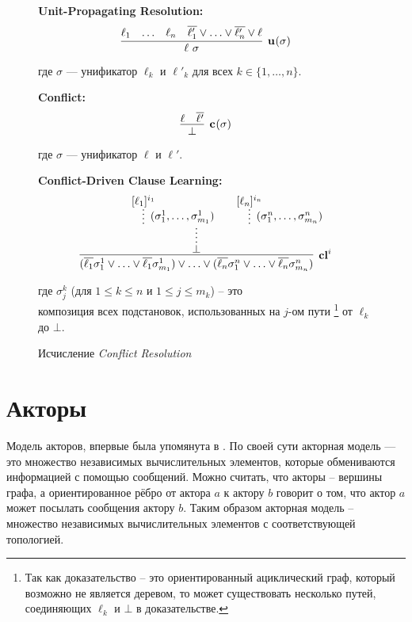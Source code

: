 \begin{figure}
\begin{calculus}
\centering
\textbf{Unit-Propagating Resolution:}
$$
\infer[\upr{}{\sigma}]
	  {\ell~\sigma}
      {\ell_1 & \ldots & \ell_n & \overline{\ell'_1} \vee \ldots \vee \overline{\ell'_n} \vee \ell}
$$

где $\sigma$ --- унификатор $\ell_k$ и $\ell'_k$ для всех $k \in \{1, \ldots, n \}$.

\bigskip

\textbf{Conflict:}
$$
\infer[\confl{}{\sigma}]
      {\bot}
      {\ell & \overline{\ell'}}
$$

где $\sigma$ --- унификатор $\ell$ и $\ell'$.

\bigskip

\textbf{Conflict-Driven Clause Learning:}
$$
\infer[\cdcl{}{i}]
      {(\overline{\ell_1} \sigma^1_1 \vee \ldots \vee \overline{\ell_1} \sigma^1_{m_1}) \vee \ldots \vee (\overline{\ell_n} \sigma^n_1 \vee \ldots \vee \overline{\ell_n} \sigma^n_{m_n})
      }
	  {\infer*{\bot}{\infer*[(\sigma_1^1,\ldots,\sigma_{m_1}^1)]{}{[\ell_1]^{\dls{i}{1}}} &  & \infer*[(\sigma_1^n,\ldots,\sigma_{m_n}^n)]{}{[\ell_n]^{\dls{i}{n}}}}
      }
$$

где $\sigma^k_j$ (для $1 \leq k \leq n$ и $1 \leq j \leq m_k$) -- это \\
композиция всех подстановок, использованных на $j$-ом пути \footnote{Так как
  доказательство -- это ориентированный ациклический граф, который возможно не
  является деревом, то может существовать несколько путей, соединяющих $\ell_k$ и
  $\bot$ в доказательстве.} от $\ell_k$ до $\bot$.

\end{calculus}
\caption{Исчисление \emph{Conflict Resolution}}
\label{fig:CR}
\end{figure}


\section{Акторы}

  Модель акторов, впервые была упомянута в \cite{Hewitt:1973:UMA:1624775.1624804}. По своей сути акторная модель --- это множество независимых вычислительных элементов, которые обмениваются информацией с помощью сообщений. Можно считать, что акторы -- вершины графа, а ориентированное рёбро от актора $a$ к актору $b$ говорит о том, что актор $a$ может посылать сообщения актору $b$. Таким образом акторная модель -- множество независимых вычислительных элементов с соответствующей топологией. 
  
